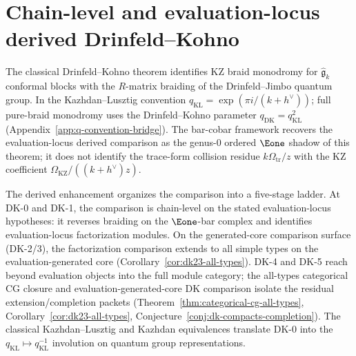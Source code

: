 \section{Chain-level and evaluation-locus derived Drinfeld--Kohno}
\label{sec:derived-dk}

The classical Drinfeld--Kohno theorem \cite{Kohno87, Drinfeld90}
identifies KZ braid monodromy for
$\widehat{\mathfrak{g}}_k$ conformal blocks with the $R$-matrix
braiding of the Drinfeld--Jimbo quantum group. In the
Kazhdan--Lusztig convention
$q_{\mathrm{KL}}=\exp(\pi i/(k+h^\vee))$; full pure-braid monodromy
uses the Drinfeld--Kohno parameter
$q_{\mathrm{DK}}=q_{\mathrm{KL}}^2$
\textup{(}Appendix~\ref{app:q-convention-bridge}\textup{)}.
The bar-cobar framework recovers the evaluation-locus derived
comparison as the genus-$0$ ordered $\Eone$ shadow of this theorem; it
does not identify the trace-form collision residue
$k\Omega_{\mathrm{tr}}/z$ with the KZ coefficient
$\Omega_{\mathrm{KZ}}/((k+h^\vee)z)$.

The derived enhancement organizes the
comparison into a five-stage ladder. At DK-0 and DK-1, the
comparison is chain-level on the stated evaluation-locus hypotheses:
it reverses braiding on the $\Eone$-bar complex and identifies
evaluation-locus factorization modules. On the generated-core
comparison surface
(DK-2/3), the factorization comparison extends to all
simple types on the evaluation-generated core
\textup{(}Corollary~\ref{cor:dk23-all-types}\textup{)}. DK-4 and DK-5
reach beyond evaluation objects into the full module category;
the all-types categorical CG closure and evaluation-generated-core
DK comparison isolate the residual extension/completion packets
\textup{(}Theorem~\ref{thm:categorical-cg-all-types},
Corollary~\ref{cor:dk23-all-types},
Conjecture~\ref{conj:dk-compacts-completion}\textup{)}.
The classical Kazhdan--Lusztig and Kazhdan
equivalences translate DK-0 into the
$q_{\mathrm{KL}} \mapsto q_{\mathrm{KL}}^{-1}$ involution on quantum
group representations.

